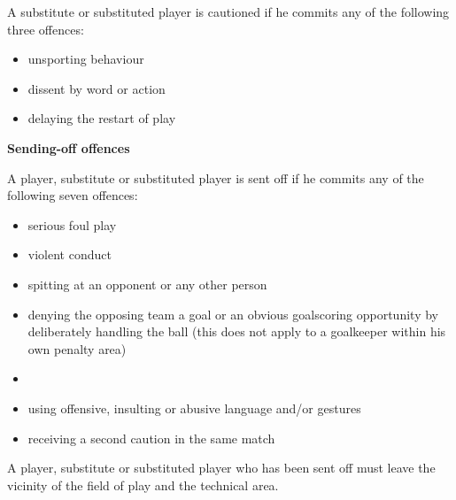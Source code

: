\bigskip

A substitute or substituted player is cautioned if he commits any of the following three offences: 

\begin{itemize}
\item unsporting behaviour
\item dissent by word or action 
\item delaying the restart of play
\end{itemize}

{\bfseries Sending-off offences}

\headlinebox

A player, substitute or substituted player is sent off if he commits any of the following seven offences:

\begin{itemize}
\item serious foul play
\item violent conduct
\item spitting at an opponent or any other person
\item denying the opposing team a goal or an obvious goalscoring opportunity by deliberately handling the ball (this does not apply to a goalkeeper within his own penalty area)
\item {}
\item using offensive, insulting or abusive language and/or gestures
\item receiving a second caution in the same match
\end{itemize}

\bigskip

A player, substitute or substituted player who has been sent off must leave the vicinity of the field of play and the technical area.
